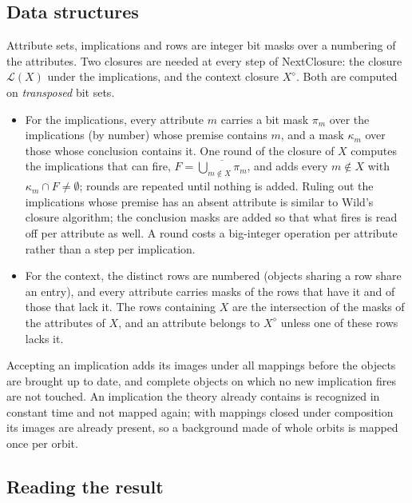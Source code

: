 \documentclass[11pt,a4paper]{article}
\theoremstyle{definition}
\theoremstyle{remark}
\newcommand{\cl}{\mathcal{L}}
\begin{document}
\subsection{Data structures}\label{sec:datastructures}

Attribute sets, implications and rows are integer bit masks over a numbering of the attributes. Two closures are needed at every step of NextClosure: the closure $\cl(X)$ under the implications, and the context closure $X^{\diamond}$. Both are computed on \emph{transposed} bit sets.
\begin{itemize}
  \item For the implications, every attribute $m$ carries a bit mask $\pi_m$ over the implications (by number) whose premise contains $m$, and a mask $\kappa_m$ over those whose conclusion contains it. One round of the closure of $X$ computes the implications that can fire, $F = \overline{\bigcup_{m \notin X} \pi_m}$, and adds every $m \notin X$ with $\kappa_m \cap F \neq \emptyset$; rounds are repeated until nothing is added. Ruling out the implications whose premise has an absent attribute is similar to Wild's closure algorithm; the conclusion masks are added so that what fires is read off per attribute as well. A round costs a big-integer operation per attribute rather than a step per implication.
  \item For the context, the distinct rows are numbered (objects sharing a row share an entry), and every attribute carries masks of the rows that have it and of those that lack it. The rows containing $X$ are the intersection of the masks of the attributes of $X$, and an attribute belongs to $X^{\diamond}$ unless one of these rows lacks it.
\end{itemize}
Accepting an implication adds its images under all mappings before the objects are brought up to date, and complete objects on which no new implication fires are not touched. An implication the theory already contains is recognized in constant time and not mapped again; with mappings closed under composition its images are already present, so a background made of whole orbits is mapped once per orbit.

\subsection{Reading the result}\label{sec:reduced}
\end{document}
